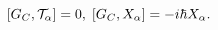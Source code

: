 \begin{equation}
\lbrack G_{C},{\cal T}_{\alpha}]=0,\;[G_{C},X_{\alpha}]=-i\hbar X_{\alpha
}.\label{3.9}%
\end{equation}

